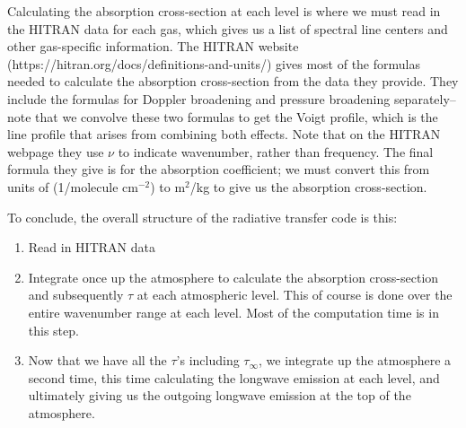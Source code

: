 \documentclass[pdftex,twoside,authoryear,round,12pt]{article}
\begin{document}
Calculating the absorption cross-section at each level is where we must read in the HITRAN data for each gas, which gives us a list of spectral line centers and other gas-specific information. The HITRAN website (https://hitran.org/docs/definitions-and-units/) gives most of the formulas needed to calculate the absorption cross-section from the data they provide. They include the formulas for Doppler broadening and pressure broadening separately--  note that we convolve these two formulas to get the Voigt profile, which is the line profile that arises from combining both effects. Note that on the HITRAN webpage they use $\nu$ to indicate wavenumber, rather than frequency. The final formula they give is for the absorption coefficient; we must convert this from units of (1/molecule cm$^{-2}$) to m$^2$/kg to give us the absorption cross-section. 

To conclude, the overall structure of the radiative transfer code is this: 
\begin{enumerate}
\item Read in HITRAN data
\item Integrate once up the atmosphere to calculate the absorption cross-section and subsequently $\tau$ at each atmospheric level. This of course is done over the entire wavenumber range at each level. Most of the computation time is in this step.
\item Now that we have all the $\tau$'s including $\tau_\infty$, we integrate up the atmosphere a second time, this time calculating the longwave emission at each level, and ultimately giving us the outgoing longwave emission at the top of the atmosphere.
\end{enumerate}
\end{document}
